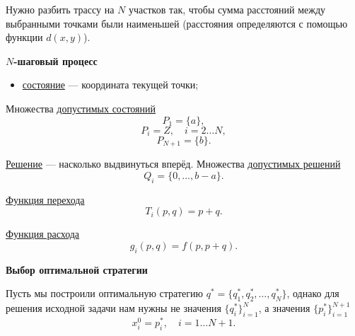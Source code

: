 Нужно разбить трассу на $N$ участков так, чтобы сумма расстояний между выбранными точками были наименьшей (расстояния определяются с помощью функции $d(x, y)$).

\begin{center}
\end{center}

\textbf{$N$-шаговый процесс}

\begin{itemize}[nosep]
	\item \underline{состояние} --- координата текущей точки;
\end{itemize}

Множества \underline{допустимых состояний}
\[
P_1 = \{a\},
\]
\[
P_i = Z, \quad i = 2 \dots N,
\]
\[
P_{N+1} = \{b\}.
\]

\underline{Решение} --- насколько выдвинуться вперёд. Множества \underline{допустимых решений}
\[
Q_i = \{0, \dots, b-a\}.
\]

\underline{Функция перехода}
\[
T_i(p, q) = p + q.
\]

\underline{Функция расхода}
\[
g_i(p, q) = f(p, p + q).
\]

\textbf{Выбор оптимальной стратегии}

Пусть мы построили оптимальную стратегию $q^* = \{q_1^*, q_2^*, \dots, q_N^*\}$, однако для решения исходной задачи нам нужны не значения $\{q_i^*\}_{i=1}^N$, а значения $\{p_i^*\}_{i=1}^{N+1}$
\[
x_i^0 = p_i^*, \quad i = 1 \dots N+1.
\]

